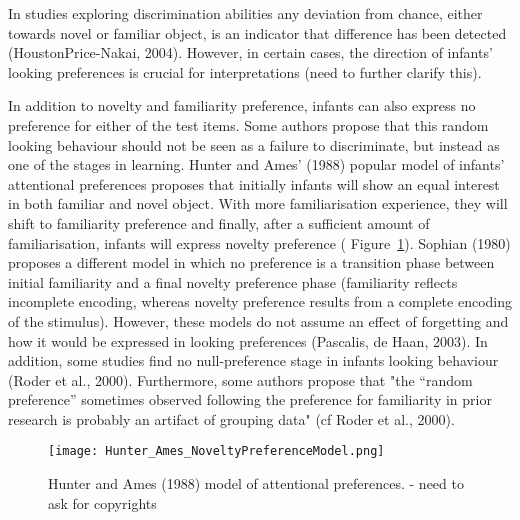 \documentclass[a4paper,man,natbib]{apa6}
\begin{document}
In studies exploring discrimination abilities any deviation from chance, either towards novel or familiar object, is an indicator that difference has been detected (HoustonPrice-Nakai, 2004). However, in certain cases, the direction of infants' looking preferences is crucial for interpretations (need to further clarify this).

In addition to novelty and familiarity preference, infants can also express no preference for either of the test items. Some authors propose that this random looking behaviour should not be seen as a failure to discriminate, but instead as one of the stages in learning. Hunter and Ames' (1988) popular model of infants' attentional preferences proposes that initially infants will show an equal interest in both familiar and novel object. With more familiarisation experience, they will shift to familiarity preference and finally, after a sufficient amount of familiarisation, infants will express novelty preference ( Figure~\ref{fig:NovPref}). 
Sophian (1980) proposes a different model in which no preference is a transition phase between initial familiarity and a final novelty preference phase (familiarity reflects incomplete encoding, whereas novelty preference results from a complete encoding of the stimulus). However, these models do not assume an effect of forgetting and how it would be expressed in looking preferences (Pascalis, de Haan, 2003). In addition, some studies find no null-preference stage in infants looking behaviour (Roder et al., 2000). Furthermore, some authors propose that "the “random preference” sometimes observed following the preference for familiarity in prior research %
is probably an artifact of grouping data" (cf Roder et al., 2000).

\begin{figure}
\centering
\texttt{[image: Hunter\_Ames\_NoveltyPreferenceModel.png]}
\caption{\label{fig:NovPref}Hunter and Ames (1988) model of attentional preferences. - need to ask for copyrights}
\end{figure}
\end{document}
